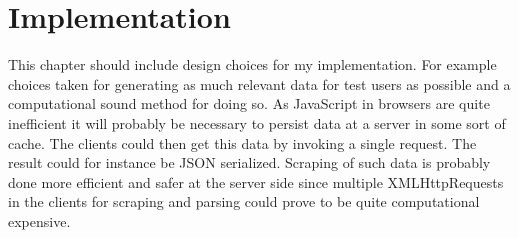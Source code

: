 \chapter{Implementation}
\label{chapter:implementation}

This chapter should include design choices for my implementation. For example
choices taken for generating as much relevant data for test users as possible
and a computational sound method for doing so. As JavaScript in browsers are
quite inefficient it will probably be necessary to persist data at a server
in some sort of cache. The clients could then get this data by invoking a
single request. The result could for instance be JSON serialized. Scraping of
such data is probably done more efficient and safer at the server side since
multiple XMLHttpRequests in the clients for scraping and parsing could prove
to be quite computational expensive.
